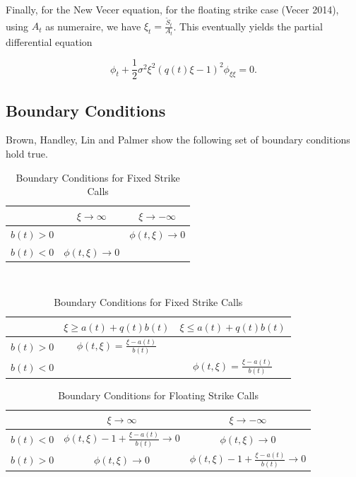 \documentclass{article}
\begin{document}
Finally, for the New Vecer equation, for the floating strike case (Vecer 2014), using \(A_t\) as numeraire, we have \(\xi_t = \frac{\tilde{S}_t}{A_t}\). This eventually yields the partial differential equation %

\begin{equation}
  \phi_t + \frac{1}{2}\sigma^2\xi^2(q(t)\xi - 1)^2 \phi_{\xi\xi} = 0.
\end{equation}

\subsection{Boundary Conditions}
Brown, Handley, Lin and Palmer\cite{main_paper} show the following set of boundary conditions hold true.

\begin{table}[H]
  \begin{tabular}{|c|c|c|}
    \hline
    & \(\xi \rightarrow \infty\) & \(\xi \rightarrow -\infty\) \\
    \hline
    \(b(t) > 0\) &  & \(\phi(t, \xi) \rightarrow 0\) \\
    \(b(t) < 0\) & \(\phi(t, \xi) \rightarrow 0\) & \\
    \hline
  \end{tabular}\\
  \begin{tabular}{|c|c|c|}
    \hline
    & \(\xi \ge a(t) + q(t)b(t)\) & \(\xi \le a(t) + q(t)b(t)\) \\
    \hline
    \(b(t) > 0\) & \(\phi(t, \xi) = \frac{\xi-a(t)}{b(t)} \) & \\
    \(b(t) < 0\) &  & \( \phi(t, \xi) = \frac{\xi-a(t)}{b(t)} \) \\
    \hline
  \end{tabular}
  \caption{Boundary Conditions for Fixed Strike Calls}
\end{table}

\begin{table}[H]
  \begin{tabular}{|c|c|c|}
    \hline
      & \(\xi \rightarrow \infty\) & \(\xi \rightarrow -\infty\) \\
    \hline
      \(b(t) < 0\) & \(\phi(t, \xi) - 1 + \frac{\xi - a(t)}{b(t)} \rightarrow 0\) & \(\phi(t, \xi) \rightarrow 0\)\\
      \(b(t) > 0\) & \(\phi(t, \xi) \rightarrow 0\) & \(\phi(t, \xi) - 1 + \frac{\xi - a(t)}{b(t)} \rightarrow 0\)\\
    \hline
  \end{tabular}
  \caption{Boundary Conditions for Floating Strike Calls}
\end{table}
\end{document}
